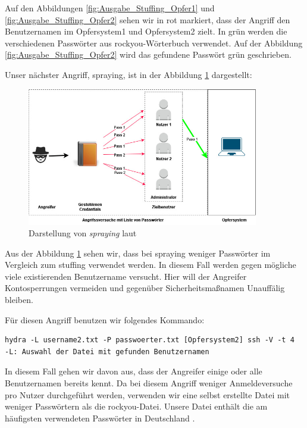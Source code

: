 Auf den Abbildungen \ref{fig:Ausgabe_Stuffing_Opfer1} und \ref{fig:Ausgabe_Stuffing_Opfer2} sehen wir in rot markiert, dass der Angriff den Benutzernamen  im Opfersystem1 und  Opfersystem2 zielt. In grün werden die verschiedenen Passwörter aus \gls{rockyou}-Wörterbuch verwendet. Auf der Abbildung \ref{fig:Ausgabe_Stuffing_Opfer2} wird das gefundene Passwört grün geschrieben.

Unser nächster Angriff, \gls{spraying}, ist in der Abbildung \ref{fig:spraying} dargestellt:
\begin{figure}[H]
   \centering
   \includegraphics[width=0.9\textwidth]{assets/Spraying.jpg}
   \caption[Darstellung von \textit{\gls{spraying}}]
   {Darstellung von \textit{\gls{spraying}} laut \cite{Swathi_spraxy}}
   \label{fig:spraying}
   \centering
\end{figure}

Aus der Abbildung \ref{fig:spraying} sehen wir, dass bei \gls{spraying} weniger Passwörter im Vergleich zum \gls{stuffing} verwendet werden. In diesem Fall werden gegen mögliche viele existierenden Benutzername versucht. Hier will der Angreifer  Kontosperrungen vermeiden und gegenüber Sicherheitsmaßnamen Unauffälig bleiben.

Für diesen Angriff benutzen wir folgendes Kommando:
{
\begin{Verbatim}[frame=single]
hydra -L username2.txt -P passwoerter.txt [Opfersystem2] ssh -V -t 4
-L: Auswahl der Datei mit gefunden Benutzernamen
\end{Verbatim}
}

In diesem Fall gehen wir davon aus, dass der Angreifer einige oder alle Benutzernamen bereits kennt. Da bei diesem Angriff weniger Anmeldeversuche pro Nutzer durchgeführt werden, verwenden wir eine selbst erstellte Datei mit weniger Passwörtern als die \gls{rockyou}-Datei. Unsere Datei enthält die am häufigsten verwendeten Passwörter in Deutschland \citep{silicon_passwort}.

